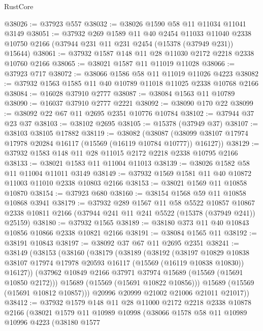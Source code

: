 \begin{lexlean}{RustCore}
\begin{coremodule}
@38026 := @37923 @557
@38032 := @38026 @1590 @58 @11 @11034 @11041 @3149
@38051 := @37932
    @269
    @1589
    @11
    @40
    @2454
    @11033
    @11040
    @2338
    @10750
    @2166
    (@37944 @231 @11 @231 @2454 (@15378 (@37949 @231)) @15644)
@38061 := @37932 @1587 @148 @11 @28 @11030 @2172 @2218 @2338 @10760 @2166
@38065 := @38021 @1587 @11 @11019 @11028
@38066 := @37923 @717
@38072 := @38066 @1586 @58 @11 @11019 @11026 @4223
@38082 := @37932 @1563 @1585 @11 @40 @10789 @11018 @11025 @2338 @10768 @2166
@38084 := @16028 @37910 @2777
@38087 := @38084 @1563 @11 @10789
@38090 := @16037 @37910 @2777 @2221
@38092 := @38090 @170 @22
@38099 := @38092 @22 @67 @11 @2695 @2351 @10776 @10784
@38102 := @37944 @37 @23 @37
@38103 := @38102 @2695
@38105 := @15378 (@37949 @37)
@38107 := @38103 @38105 @17882
@38119 := @38082
    (@38087 (@38099 @38107 @17974 @17978 @20284 @16117 (@15569 (@16119 @10784 @10777)) @16127))
@38129 := @37932 @1583 @148 @11 @28 @11015 @2172 @2218 @2338 @10795 @2166
@38133 := @38021 @1583 @11 @11004 @11013
@38139 := @38026 @1582 @58 @11 @11004 @11011 @3149
@38149 := @37932 @1569 @1581 @11 @40 @10872 @11003 @11010 @2338 @10803 @2166
@38153 := @38021 @1569 @11 @10858 @10870
@38154 := @37923 @680
@38160 := @38154 @1568 @59 @11 @10858 @10868 @3941
@38179 := @37932
    @289
    @1567
    @11
    @58
    @5522
    @10857
    @10867
    @2338
    @10811
    @2166
    (@37944 @241 @11 @241 @5522 (@15378 (@37949 @241)) @25159)
@38180 := @37932 @1565
@38189 := @38180 @373 @11 @40 @10843 @10856 @10866 @2338 @10821 @2166
@38191 := @38084 @1565 @11
@38192 := @38191 @10843
@38197 := @38092 @37 @67 @11 @2695 @2351
@38241 := @38149
    (@38153
      (@38160
        (@38179
          (@38189
            (@38192
              (@38197
                @10829
                @10838
                @38107
                @17974
                @17978
                @20593
                @16117
                (@15569 (@16119 @10838 @10830))
                @16127))
            (@37962 @10849 @2166 @37971 @37974 @15689 (@15569 (@15691 @10850 @2172)))
            @15689
            (@15569 (@15691 @10822 @10856)))
          @15689
          (@15569 (@15691 @10812 @10857)))
        @20996
        @20999
        @21002
        @21006
        @21011
        @21017))
@38412 := @37932
    @1579
    @148
    @11
    @28
    @11000
    @2172
    @2218
    @2338
    @10878
    @2166
    (@38021
      @1579
      @11
      @10989
      @10998
      (@38066
        @1578
        @58
        @11
        @10989
        @10996
        @4223
        (@38180
          @1577

\end{coremodule}
\end{lexlean}
